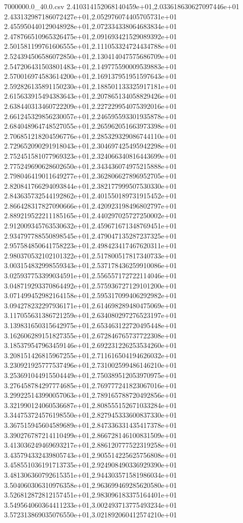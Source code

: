 \begin{filecontents*}{7000000.0_40.0.csv}
2.410314152068140459e+01,2.033618630627097446e+01
2.433132987186072427e+01,2.052976074405705731e+01
2.455950440129048928e+01,2.072334338064683834e+01
2.478766510965326475e+01,2.091693421529089392e+01
2.501581199761606555e+01,2.111053324724434788e+01
2.524394506586072850e+01,2.130414047575686709e+01
2.547206431503801483e+01,2.149775590009539883e+01
2.570016974583614200e+01,2.169137951951597643e+01
2.592826135891150230e+01,2.188501133325917181e+01
2.615633915494383643e+01,2.207865134058829426e+01
2.638440313460722209e+01,2.227229954075392016e+01
2.661245329856230057e+01,2.246595593301935878e+01
2.684048964748527055e+01,2.265962051663973398e+01
2.706851218204596776e+01,2.285329329086744110e+01
2.729652090291918043e+01,2.304697425495942298e+01
2.752451581077969323e+01,2.324066340816443699e+01
2.775249690628602650e+01,2.343436074975215888e+01
2.798046419011649277e+01,2.362806627896952705e+01
2.820841766294093844e+01,2.382177999507530330e+01
2.843635732544192862e+01,2.401550189731915452e+01
2.866428317827090666e+01,2.420923198496802797e+01
2.889219522211185165e+01,2.440297025727250002e+01
2.912009345763530632e+01,2.459671671348769451e+01
2.934797788550898545e+01,2.479047135287237325e+01
2.957584850641758223e+01,2.498423417467620311e+01
2.980370532102101322e+01,2.517800517817340733e+01
3.003154832998559343e+01,2.537178436259910086e+01
3.025937753399034591e+01,2.556557172722114046e+01
3.048719293370864492e+01,2.575936727129101200e+01
3.071499452982164158e+01,2.595317099406292982e+01
3.094278232297936171e+01,2.614698289480475069e+01
3.117055631386721259e+01,2.634080297276523197e+01
3.139831650315642975e+01,2.653463122720495448e+01
3.162606289151827355e+01,2.672846765737722308e+01
3.185379547963459146e+01,2.692231226253534260e+01
3.208151426815967255e+01,2.711616504194626032e+01
3.230921925777537496e+01,2.731002599486146210e+01
3.253691044915504449e+01,2.750389512053970975e+01
3.276458784297774685e+01,2.769777241823067016e+01
3.299225143990057063e+01,2.789165788720492856e+01
3.321990124060536687e+01,2.808555152671033284e+01
3.344753724576198550e+01,2.827945333600837330e+01
3.367515945604589689e+01,2.847336331435417378e+01
3.390276787214110499e+01,2.866728146100831509e+01
3.413036249469693217e+01,2.886120777522319258e+01
3.435794332439805743e+01,2.905514225625756808e+01
3.458551036191713735e+01,2.924908490336929390e+01
3.481306360792615351e+01,2.944303571581986034e+01
3.504060306310976358e+01,2.963699469285620580e+01
3.526812872812157451e+01,2.983096183375164401e+01
3.549564060364411233e+01,3.002493713775493234e+01
3.572313869035076550e+01,3.021892060412574210e+01

\end{filecontents*}
